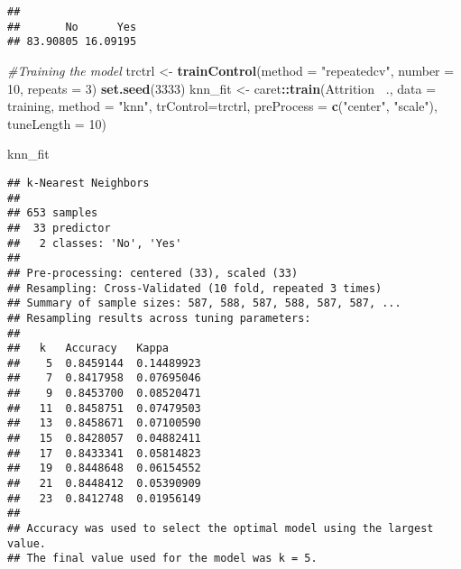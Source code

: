 \documentclass[]{article}
\newenvironment{Shaded}{\begin{snugshade}}{\end{snugshade}}
\newcommand{\CommentTok}[1]{\textcolor[rgb]{0.56,0.35,0.01}{\textit{#1}}}
\newcommand{\DataTypeTok}[1]{\textcolor[rgb]{0.13,0.29,0.53}{#1}}
\newcommand{\DecValTok}[1]{\textcolor[rgb]{0.00,0.00,0.81}{#1}}
\newcommand{\KeywordTok}[1]{\textcolor[rgb]{0.13,0.29,0.53}{\textbf{#1}}}
\newcommand{\NormalTok}[1]{#1}
\newcommand{\OperatorTok}[1]{\textcolor[rgb]{0.81,0.36,0.00}{\textbf{#1}}}
\newcommand{\StringTok}[1]{\textcolor[rgb]{0.31,0.60,0.02}{#1}}
\begin{document}
\begin{verbatim}
## 
##       No      Yes 
## 83.90805 16.09195
\end{verbatim}

\begin{Shaded}
\begin{Highlighting}[]
\CommentTok{#Training the model}
\NormalTok{trctrl <-}\StringTok{ }\KeywordTok{trainControl}\NormalTok{(}\DataTypeTok{method =} \StringTok{"repeatedcv"}\NormalTok{, }\DataTypeTok{number =} \DecValTok{10}\NormalTok{, }\DataTypeTok{repeats =} \DecValTok{3}\NormalTok{)}
\KeywordTok{set.seed}\NormalTok{(}\DecValTok{3333}\NormalTok{)}
\NormalTok{knn_fit <-}\StringTok{ }\NormalTok{caret}\OperatorTok{::}\KeywordTok{train}\NormalTok{(Attrition }\OperatorTok{~}\NormalTok{., }\DataTypeTok{data =}\NormalTok{ training, }\DataTypeTok{method =} \StringTok{"knn"}\NormalTok{,}
 \DataTypeTok{trControl=}\NormalTok{trctrl,}
 \DataTypeTok{preProcess =} \KeywordTok{c}\NormalTok{(}\StringTok{"center"}\NormalTok{, }\StringTok{"scale"}\NormalTok{),}
 \DataTypeTok{tuneLength =} \DecValTok{10}\NormalTok{)}

\NormalTok{knn_fit}
\end{Highlighting}
\end{Shaded}

\begin{verbatim}
## k-Nearest Neighbors 
## 
## 653 samples
##  33 predictor
##   2 classes: 'No', 'Yes' 
## 
## Pre-processing: centered (33), scaled (33) 
## Resampling: Cross-Validated (10 fold, repeated 3 times) 
## Summary of sample sizes: 587, 588, 587, 588, 587, 587, ... 
## Resampling results across tuning parameters:
## 
##   k   Accuracy   Kappa     
##    5  0.8459144  0.14489923
##    7  0.8417958  0.07695046
##    9  0.8453700  0.08520471
##   11  0.8458751  0.07479503
##   13  0.8458671  0.07100590
##   15  0.8428057  0.04882411
##   17  0.8433341  0.05814823
##   19  0.8448648  0.06154552
##   21  0.8448412  0.05390909
##   23  0.8412748  0.01956149
## 
## Accuracy was used to select the optimal model using the largest value.
## The final value used for the model was k = 5.
\end{verbatim}

\begin{Shaded}
\end{Shaded}
\end{document}
